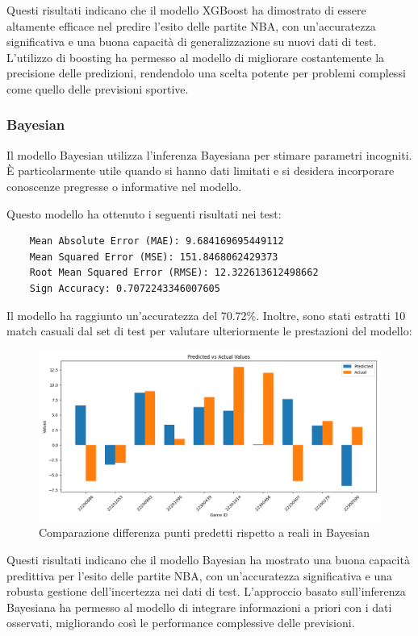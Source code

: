 Questi risultati indicano che il modello XGBoost ha dimostrato di essere altamente efficace nel predire l'esito delle partite NBA, con un'accuratezza significativa e una buona capacità di generalizzazione su nuovi dati di test. L'utilizzo di boosting ha permesso al modello di migliorare costantemente la precisione delle predizioni, rendendolo una scelta potente per problemi complessi come quello delle previsioni sportive.


\subsubsection{Bayesian}

Il modello Bayesian utilizza l'inferenza Bayesiana per stimare parametri incogniti. È particolarmente utile quando si hanno dati limitati e si desidera incorporare conoscenze pregresse o informative nel modello.

Questo modello ha ottenuto i seguenti risultati nei test:

\begin{lstlisting}
    Mean Absolute Error (MAE): 9.684169695449112
    Mean Squared Error (MSE): 151.8468062429373
    Root Mean Squared Error (RMSE): 12.322613612498662
    Sign Accuracy: 0.7072243346007605
\end{lstlisting}

Il modello ha raggiunto un'accuratezza del 70.72\%. Inoltre, sono stati estratti 10 match casuali dal set di test per valutare ulteriormente le prestazioni del modello:

\begin{figure}[H]
    \centering
    \includegraphics[width=0.7\linewidth]{img/bayesian_istogramma.png}
    \caption{Comparazione differenza punti predetti rispetto a reali in Bayesian}
    \label{fig:enter-label}
\end{figure}

Questi risultati indicano che il modello Bayesian ha mostrato una buona capacità predittiva per l'esito delle partite NBA, con un'accuratezza significativa e una robusta gestione dell'incertezza nei dati di test. L'approccio basato sull'inferenza Bayesiana ha permesso al modello di integrare informazioni a priori con i dati osservati, migliorando così le performance complessive delle previsioni.


